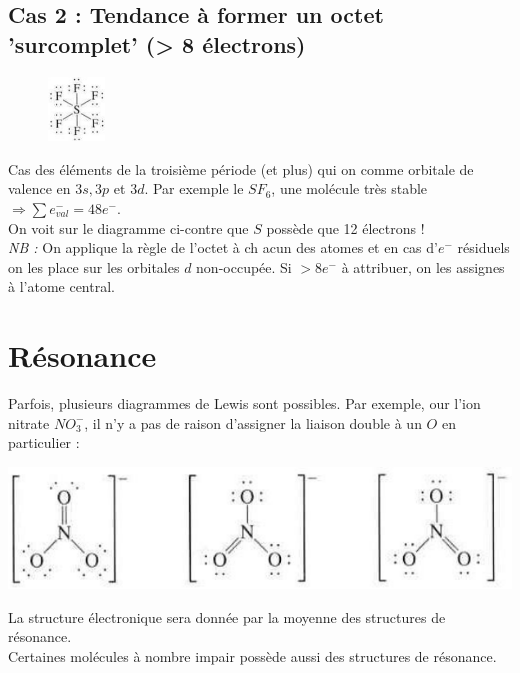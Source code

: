 \documentclass[british,french,11pt, a4paper, openany]{book}
\begin{document}
\subsection{Cas 2 :  Tendance à former un octet 'surcomplet' (> 8 électrons)}
\begin{figure}
	\includegraphics[width=1.5cm]{image9.png}
\end{figure}
Cas des éléments de la troisième période (et plus) qui on comme orbitale de valence en $3s, 3p$ et $3d$. Par exemple le $SF_6$, une molécule très stable\\
$\Rightarrow \sum e^-_{val} = 48 e^-$.\\
On voit sur le diagramme ci-contre que $S$ possède que 12 électrons !\\

\textit{NB :} On applique la règle de l'octet à ch acun des atomes et en cas d'$e^-$ résiduels on les place sur les orbitales $d$ non-occupée. Si $> 8 e^-$ à attribuer, on les assignes à l'atome central.
\newpage
\section{Résonance}
Parfois, plusieurs diagrammes de Lewis sont possibles. Par exemple, our l'ion nitrate $NO_3^-$, il  n'y a pas de raison d'assigner la liaison double à un $O$ en particulier :
\begin{center}
	\includegraphics[scale=0.55]{image10.png}\\
\end{center}
La structure électronique sera donnée par la moyenne des structures de résonance.\\
Certaines molécules à nombre impair possède aussi des structures de résonance.\\
\end{document}

